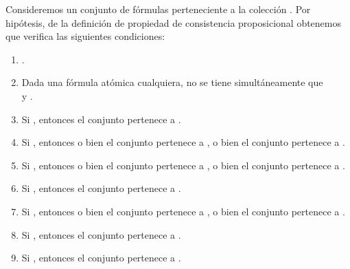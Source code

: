 \begin{isabellebody}
\begin{isamarkuptext}
\begin{demostracion}
  Consideremos un conjunto de fórmulas  perteneciente a la colección .
  Por hipótesis, de la definición de propiedad de consistencia proposicional obtenemos
  que  verifica las siguientes condiciones:
 \begin{enumerate}
      \item {}.
      \item Dada  una fórmula atómica cualquiera, no se tiene 
        simultáneamente que\\  y .
      \item Si , entonces el conjunto  pertenece a .
      \item Si , entonces o bien el conjunto  pertenece a , o bien el 
        conjunto  pertenece a .
      \item Si , entonces o bien el conjunto  pertenece a , o bien el 
        conjunto  pertenece a .
      \item Si , entonces el conjunto  pertenece a .
      \item Si , entonces o bien el conjunto  pertenece a , o bien el 
        conjunto  pertenece a .
      \item Si , entonces el conjunto  pertenece a .
      \item Si , entonces el conjunto  pertenece a .
 \end{enumerate}


\end{demostracion}
\end{isamarkuptext}
\end{isabellebody}
